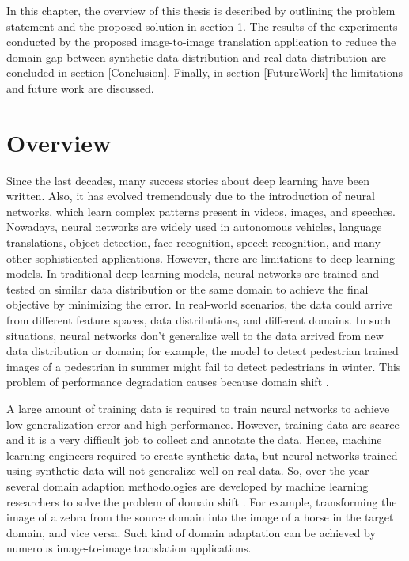 \justifying
\setlength{\parskip}{1em}



In this chapter, the overview of this thesis is described by outlining the problem statement and the proposed solution in section \ref{Overview}. The results of the experiments conducted by the proposed image-to-image translation application to reduce the domain gap between synthetic data distribution and real data distribution are concluded in section \ref{Conclusion}. Finally, in section \ref{FutureWork} the limitations and future work are discussed.


\section{Overview}\label{Overview}

Since the last decades, many success stories about deep learning have been written. Also, it has evolved tremendously due to the introduction of neural networks, which learn complex patterns present in videos, images, and speeches. Nowadays, neural networks are widely used in autonomous vehicles, language translations, object detection, face recognition, speech recognition, and many other sophisticated applications. However, there are limitations to deep learning models. In traditional deep learning models, neural networks are trained and tested on similar data distribution or the same domain to achieve the final objective by minimizing the error. In real-world scenarios, the data could arrive from different feature spaces, data distributions, and different domains. In such situations, neural networks don't generalize well to the data arrived from new data distribution or domain; for example, the model to detect pedestrian trained images of a pedestrian in summer might fail to detect pedestrians in winter. This problem of performance degradation causes because domain shift \cite{farahani2020brief}.

A large amount of training data is required to train neural networks to achieve low generalization error and high performance. However, training data are scarce and it is a very difficult job to collect and annotate the data. Hence, machine learning engineers required to create synthetic data, but neural networks trained using synthetic data will not generalize well on real data. So, over the year several domain adaption methodologies are developed by machine learning researchers to solve the problem of domain shift \cite{farahani2020brief}. For example, transforming the image of a zebra from the source domain into the image of a horse in the target domain, and vice versa. Such kind of domain adaptation can be achieved by numerous image-to-image translation applications.

